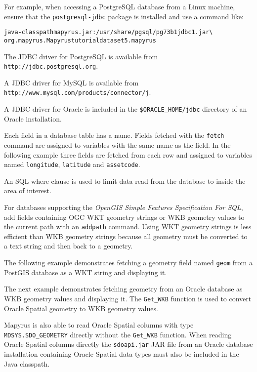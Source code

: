 For example, when accessing a PostgreSQL database from a Linux
machine, ensure that the \texttt{postgresql-jdbc} package is
installed and use a command like:

\begin{alltt}
java -classpath mapyrus.jar:/usr/share/pgsql/pg73b1jdbc1.jar \textbackslash
  org.mapyrus.Mapyrus tutorialdataset5.mapyrus
\end{alltt}

The JDBC driver for PostgreSQL is available from
\texttt{http://jdbc.postgresql.org}.

A JDBC driver for MySQL is available from
\newline
\texttt{http://www.mysql.com/products/connector/j}.

A JDBC driver for Oracle is included in the
\texttt{\$ORACLE\_HOME/jdbc} directory of an Oracle installation.

Each field in a database table has a name.
Fields fetched with the
\texttt{fetch}
command are assigned to variables with the same name as the field.
In the following example three fields are fetched from each
row and assigned to variables named
\texttt{longitude}, \texttt{latitude} and \texttt{assetcode}.

An SQL where clause is used to limit data read from
the database to inside the area of interest.



For databases supporting the \textit{OpenGIS Simple Features Specification For
SQL}, add fields containing OGC WKT geometry strings or WKB geometry values
to the current path with an \texttt{addpath} command.  Using WKT geometry
strings is less efficient than WKB geometry strings because all geometry
must be converted to a text string and then back to a geometry.

The following example demonstrates fetching a geometry field named \texttt{geom}
from a PostGIS database as a WKT string and displaying it.



The next example demonstrates fetching geometry from an
Oracle database as WKB geometry values and displaying it.
The \texttt{Get\_WKB} function is used to convert Oracle
Spatial geometry to WKB geometry values.



Mapyrus is also able to read Oracle Spatial
columns with type \texttt{MDSYS.SDO\_GEOMETRY} directly
without the \texttt{Get\_WKB} function.  When reading
Oracle Spatial columns directly the
\texttt{sdoapi.jar}
JAR file from an Oracle database installation
containing Oracle Spatial data types must also be
included in the Java classpath.

